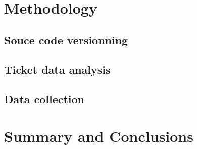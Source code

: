 \documentclass[10pt,conference]{IEEEtran}
\begin{document}
\section{Methodology}
\label{sec:methodology}
\subsection{Souce code versionning}

\subsection{Ticket data analysis}

\subsection{Data collection}

\section{Summary and Conclusions}
\label{sec:conclusion}


%


\vspace{12pt}
\end{document}
